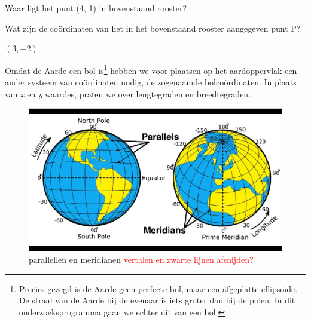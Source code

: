 \begin{opgave}
	\begin{subopgave}
		Waar ligt het punt (4, 1) in bovenstaand rooster?
		\begin{antwoord}		
		\end{antwoord}
	\end{subopgave}
	\begin{subopgave}
		Wat zijn de co\"ordinaten van het in het bovenstaand rooster aangegeven punt P?
		\begin{antwoord}
			$(3, -2)$
		\end{antwoord}
	\end{subopgave}
\end{opgave}

Omdat de Aarde een bol is\footnote{Precies gezegd is de Aarde geen perfecte bol, maar een afgeplatte ellipso\"ide. De straal van de Aarde bij de evenaar is iets groter dan bij de polen. In dit onderzoeksprogramma gaan we echter uit van een bol.} hebben we voor plaatsen op het aardoppervlak een ander systeem van co\"ordinaten nodig, de zogenaamde bolco\"ordinaten. In plaats van \textit{x} en \textit{y} waardes, praten we over lengtegraden en breedtegraden.

\begin{figure}[h]
	\centering
	\includegraphics[width=15cm]{Parallels-and-Meridians.eps}
	\caption{parallellen en meridianen \textcolor{red}{vertalen en zwarte lijnen afsnijden?}}
	\label{fig_par_mer}
\end{figure}

